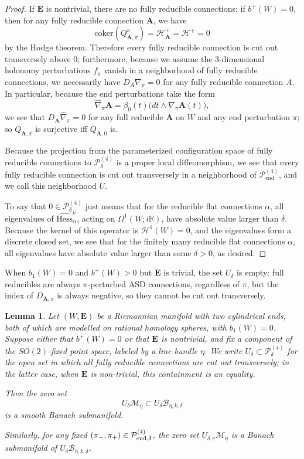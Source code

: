 \documentclass{memo-l}
\newtheorem{lemma}[theorem]{Lemma}
\theoremstyle{definition}
\theoremstyle{remark}
\numberwithin{section}{chapter}
\numberwithin{equation}{chapter}
\begin{document}
\begin{proof}If $\mathbf{E}$ is nontrivial, there are no fully reducible connections; if $b^+(W) = 0$, then for any fully reducible connection $\mathbf{A}$, we have
$$\text{coker}(Q^\nu_{\mathbf{A},\pi}) = \mathcal H^+_{\mathbf{A}} = \mathcal H^+ = 0$$
by the Hodge theorem. Therefore every fully reducible connection is cut out transversely above $0$; furthermore, because we assume the 3-dimensional holonomy perturbations $f_\pi$ vanish in a neighborhood of fully reducible connections, we necessarily have $D_{A}\nabla_\pi = 0$ for any fully reducible connection $A$. 
In particular, because the end perturbations take the form 
$$\widehat{\nabla}_\pi \mathbf{A} = \beta_0(t) \big(dt \wedge \nabla_\pi \mathbf{A}(t)\big),$$
we see that $D_{\mathbf{A}} \widehat{\nabla}_\pi = 0$ for any full reducible $\mathbf{A}$ on $W$ and any end perturbation $\pi$; so $Q_{\mathbf{A},\pi}$ is surjective iff $Q_{\mathbf{A},0}$ is.

Because the projection from the parameterized configuration space of fully reducible connections to $\mathcal P^{(4)}_\delta$ is a proper local diffeomorphism, we see that every fully reducible connection is cut out transversely in a neighborhood of $\mathcal P^{(4)}_{\text{end}}$, and we call this neighborhood $U$.

To say that $0 \in \mathcal P^{(4)}_\delta$ just means that for the reducible flat connections $\alpha$, all eigenvalues of $\widehat{\text{Hess}}^\nu_{\alpha}$, acting on $\Omega^1(W;i\mathbb R)$, have absolute value larger than $\delta$. Because the kernel of this operator is $\mathcal H^1(W) = 0$, and the eigenvalues form a discrete closed set, we see that for the finitely many reducible flat connections $\alpha$, all eigenvalues have absolute value larger than some $\delta > 0$, as desired.
\end{proof}

When $b_1(W) = 0$ and $b^+(W) > 0$ but $\mathbf{E}$ is trivial, the set $U_{\delta}$ is empty: full reducibles are always $\pi$-perturbed ASD connections, regardless of $\pi$, but the index of $D_{\mathbf{A},\pi}$ is always negative, so they cannot be cut out transversely.

\begin{lemma}\label{zero-Banach}Let $(W,\mathbf{E})$ be a Riemannian manifold with two cylindrical ends, both of which are modelled on rational homology spheres, with $b_1(W) = 0$. Suppose either that $b^+(W) = 0$ or that $\mathbf{E}$ is nontrivial, and fix a component of the $SO(2)$-fixed point space, labeled by a line bundle $\eta$. We write $U_\delta \subset \mathcal P^{(4)}_\delta$ for the open set in which all fully reducible connections are cut out transversely; in the latter case, when $\mathbf{E}$ is non-trivial, this containment is an equality.

Then the zero set $$U_\delta \mathcal M_{\eta} \subset U_\delta \mathcal B_{\eta,k,\delta}$$ is a smooth Banach submanifold.

Similarly, for any fixed $(\pi_-, \pi_+) \in \mathcal P^{(4)}_{\textup{end},\delta}$, the zero set $U_{\delta, c} \mathcal M_\eta$ is a Banach submanifold of $U_\delta \mathcal B_{\eta, k, \delta}$. 
\end{lemma}
\end{document}
